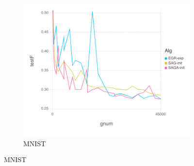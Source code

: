 \documentclass[11pt]{article}
\begin{document}
\begin{figure}[H]
\begin{subfigure}[b]{0.45\textwidth}
           \includegraphics[width=\textwidth]{Figures/MNISTBLtrueFfFinal-g.pdf}
             \caption{MNIST}
         \end{subfigure}
		 

\end{figure}
\end{document}
